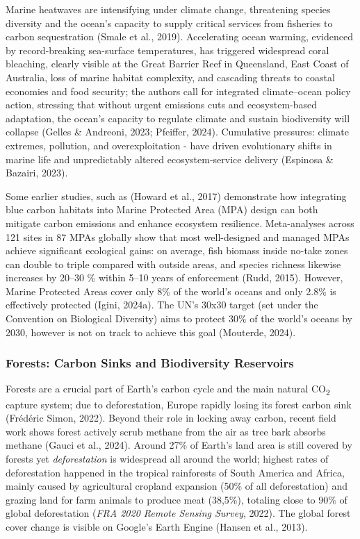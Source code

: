 \documentclass[
  12pt,
  letterpaper,
  DIV=11,
  numbers=noendperiod]{scrartcl}
\begin{document}
Marine heatwaves are intensifying under climate change, threatening
species diversity and the ocean's capacity to supply critical services
from fisheries to carbon sequestration (Smale et al., 2019).
Accelerating ocean warming, evidenced by record-breaking sea-surface
temperatures, has triggered widespread coral bleaching, clearly visible
at the Great Barrier Reef in Queensland, East Coast of Australia, loss
of marine habitat complexity, and cascading threats to coastal economies
and food security; the authors call for integrated climate--ocean policy
action, stressing that without urgent emissions cuts and ecosystem-based
adaptation, the ocean's capacity to regulate climate and sustain
biodiversity will collapse (Gelles \& Andreoni, 2023; Pfeiffer, 2024).
Cumulative pressures: climate extremes, pollution, and overexploitation
- have driven evolutionary shifts in marine life and unpredictably
altered ecosystem-service delivery (Espinosa \& Bazairi, 2023).

Some earlier studies, such as (Howard et al., 2017) demonstrate how
integrating blue carbon habitats into Marine Protected Area (MPA) design
can both mitigate carbon emissions and enhance ecosystem resilience.
Meta-analyses across 121 sites in 87 MPAs globally show that most
well-designed and managed MPAs achieve significant ecological gains: on
average, fish biomass inside no-take zones can double to triple compared
with outside areas, and species richness likewise increases by 20--30 \%
within 5--10 years of enforcement (Rudd, 2015). However, Marine
Protected Areas cover only 8\% of the world's oceans and only 2.8\% is
effectively protected (Igini, 2024a). The UN's 30x30 target (set under
the Convention on Biological Diversity) aims to protect 30\% of the
world's oceans by 2030, however is not on track to achieve this goal
(Mouterde, 2024).

\subsubsection{Forests: Carbon Sinks and Biodiversity
Reservoirs}\label{forests-carbon-sinks-and-biodiversity-reservoirs}

Forests are a crucial part of Earth's carbon cycle and the main natural
CO\textsubscript{2} capture system; due to deforestation, Europe rapidly
losing its forest carbon sink (Frédéric Simon, 2022). Beyond their role
in locking away carbon, recent field work shows forest actively scrub
methane from the air as tree bark absorbs methane (Gauci et al., 2024).
Around 27\% of Earth's land area is still covered by forests yet
\emph{deforestation} is widespread all around the world; highest rates
of deforestation happened in the tropical rainforests of South America
and Africa, mainly caused by agricultural cropland expansion (50\% of
all deforestation) and grazing land for farm animals to produce meat
(38,5\%), totaling close to 90\% of global deforestation (\emph{{FRA}
2020 {Remote Sensing Survey}}, 2022). The global forest cover change is
visible on Google's Earth Engine (Hansen et al., 2013).
\end{document}
